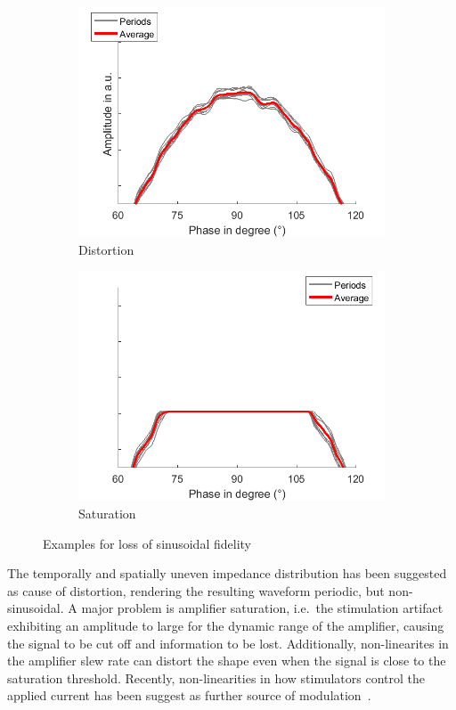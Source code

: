 \documentclass[a4paper]{article}
\begin{document}
\begin{figure}[hbtp]
    \begin{subfigure}{.5\textwidth}
    \includegraphics[width=\textwidth]{./img/distortion.png}
    \caption{Distortion}\label{fig:distortion}
    \end{subfigure}
    \begin{subfigure}{.5\textwidth}
    \includegraphics[width=\textwidth]{./img/saturation.png}
    \caption{Saturation}\label{fig:saturation}
    \end{subfigure}
    \caption{Examples for loss of sinusoidal fidelity}\label{fig:nonsinus}
\end{figure}

The temporally and spatially uneven impedance distribution has been suggested as cause of distortion, rendering the resulting waveform periodic, but non-sinusoidal. A major problem is amplifier saturation, i.e.\ the stimulation artifact exhibiting an amplitude to large for the dynamic range of the amplifier, causing the signal to be cut off and information to be lost.
Additionally, non-linearites in the amplifier slew rate can distort the shape even when the signal is close to the saturation threshold. Recently, non-linearities in how stimulators control the applied current has been suggest as further source of modulation~\citep{Neuling_2017}.
\end{document}
